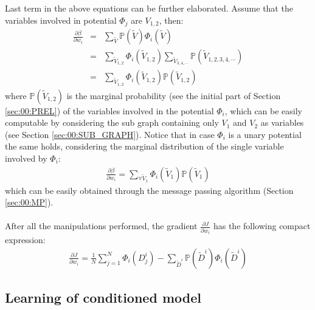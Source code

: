 Last term in the above equations can be further elaborated. Assume that the variables involved in potential $\Phi _j$ are $V_{1,2}$, then:
\begin{eqnarray}
\frac{\partial \beta}{\partial w_i} &=& \sum _{  \tilde{V} } \mathbb{P}(\tilde{V}) \Phi _i(\tilde{V}) \nonumber\\
&=& \sum _{  \tilde{V}_{1,2} } \Phi _i(\tilde{V}_{1,2}) \sum _{  \tilde{V}_{3,4,\cdots}  } \mathbb{P}(\tilde{V}_{1,2,3,4,\cdots})  \nonumber\\
&=& \sum _{  \tilde{V}_{1,2} } \Phi _i(\tilde{V}_{1,2}) \mathbb{P}(\tilde{V}_{1,2})
\end{eqnarray}
where $\mathbb{P}(\tilde{V}_{1,2})$ is the marginal probability (see the initial part of Section \ref{sec:00:PREL}) of the variables involved in the potential $\Phi _i$, which can be easily computable by considering the sub graph containing only $V_1$ and $V_2$ as variables (see Section \ref{sec:00:SUB_GRAPH}). Notice that in case $\Phi _i$ is a unary potential the same holds, considering the marginal distribution of the single variable involved by $\Phi _i$:
\begin{eqnarray}
\frac{\partial \beta}{\partial w_i} =
 \sum _{ \forall \tilde{V}_{1} } \Phi _i(\tilde{V}_{1}) \mathbb{P}(\tilde{V}_{1})
\end{eqnarray}
which can be easily obtained through the message passing algorithm (Section \ref{sec:00:MP}).
\\
\\
After all the manipulations performed, the gradient $\frac{\partial J}{\partial  w_i}$ has the following compact expression:
\begin{eqnarray}
\frac{\partial J}{\partial  w_i} =
\frac{1}{N} \sum_{j=1}^{N} \Phi_i(D^i_j) - \sum_{\tilde{D}^i} \mathbb{P}(\tilde{D}^i)\Phi_i(\tilde{D}^i)
\label{eq:00:J_grad_unc}
\end{eqnarray} 

\subsection{Learning of conditioned model}
\label{sec:00:CON_LEARN}

